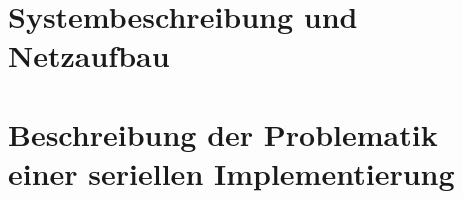 \documentclass[../main.tex]{subfiles}
\begin{document}
\section{Systembeschreibung und Netzaufbau}
\section{Beschreibung der Problematik einer seriellen Implementierung}
\end{document}

